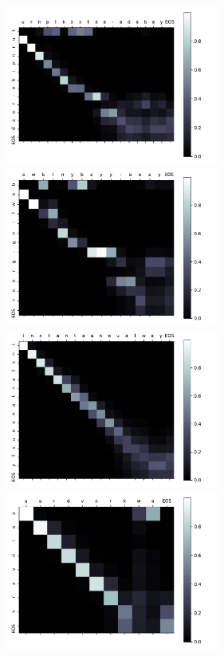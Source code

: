 \documentclass[11pt]{article}
\begin{document}
\begin{enumerate}
\begin{enumerate}
    \includegraphics[width=7cm]{assets/turnpike-road.pdf}
    \includegraphics[width=7cm]{assets/bowling-green.pdf}
    \includegraphics[width=7cm]{assets/instantaneously.pdf}
    \includegraphics[width=7cm]{assets/aardvark.pdf}
    

\end{enumerate}
\end{enumerate}
\end{document}
